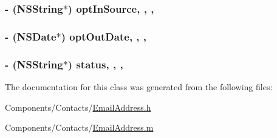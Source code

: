 \hypertarget{interface_email_address_ad0d4ec3ee2087e6d87adb83d5f061326}{
\subsubsection[{opt\-In\-Source}]{\setlength{\rightskip}{0pt plus 5cm}-\/ (N\-S\-String$\ast$) opt\-In\-Source\hspace{0.3cm}{\ttfamily [read]}, {\ttfamily [write]}, {\ttfamily [nonatomic]}, {\ttfamily [strong]}}}\label{interface_email_address_ad0d4ec3ee2087e6d87adb83d5f061326}
\hypertarget{interface_email_address_abc600398b927212d6c16f8f7414cc7c1}{
\subsubsection[{opt\-Out\-Date}]{\setlength{\rightskip}{0pt plus 5cm}-\/ (N\-S\-Date$\ast$) opt\-Out\-Date\hspace{0.3cm}{\ttfamily [read]}, {\ttfamily [write]}, {\ttfamily [nonatomic]}, {\ttfamily [strong]}}}\label{interface_email_address_abc600398b927212d6c16f8f7414cc7c1}
\hypertarget{interface_email_address_a3e1b2bf02d88d5cac97fceafc0f9901e}{
\subsubsection[{status}]{\setlength{\rightskip}{0pt plus 5cm}-\/ (N\-S\-String$\ast$) status\hspace{0.3cm}{\ttfamily [read]}, {\ttfamily [write]}, {\ttfamily [nonatomic]}, {\ttfamily [strong]}}}\label{interface_email_address_a3e1b2bf02d88d5cac97fceafc0f9901e}


The documentation for this class was generated from the following files\-:\begin{DoxyCompactItemize}
\item 
Components/\-Contacts/\hyperlink{_email_address_8h}{Email\-Address.\-h}\item 
Components/\-Contacts/\hyperlink{_email_address_8m}{Email\-Address.\-m}\end{DoxyCompactItemize}
